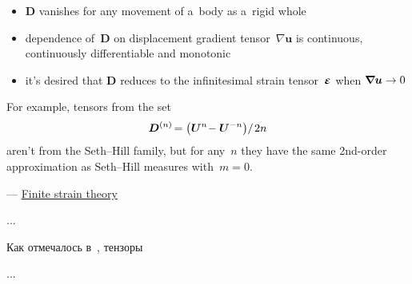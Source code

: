 \begin{itemize}
\item $\bm{D}$ vanishes for any movement of a~body as a~rigid whole
\item dependence of~$\bm{D}$ on displacement gradient tensor~${\nabla \bm{u}}$ is continuous, continuously differentiable and monotonic
\item it’s desired that $\bm{D}$ reduces to the infinitesimal strain tensor~${\mathboldepsilon}$ when ${\bm{\nabla}\hspace{-0.2ex} \bm{u} \to 0}$
\end{itemize}

\noindent For example, tensors from the set
\[ \displaystyle \bm{D}^{(n)} \hspace{-0.32ex} = \left( {\bm{U}}^{n} \hspace{-0.4ex} - {\bm{U}}^{-n} \right) \hspace{-0.4ex} / \hspace{.25ex} 2n \]
aren’t from the Seth\hbox{--}Hill family, but for any~$n$ they have the same 2nd\hbox{-}order approximation as Seth\hbox{--}Hill measures with~${m=0}$.

\vspace{.4em} \noindent \hfill {}\:--- \href{https://en.wikipedia.org/wiki/Finite_strain_theory}{Finite strain theory}

\vspace{1cm}

\begin{otherlanguage}{russian}

...

Как отмечалось в~, тензоры


...



\end{otherlanguage}



\label{para:velocityfield}

